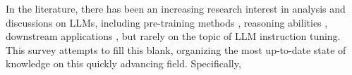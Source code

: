 \documentclass[11pt]{article}
\begin{document}
In the literature, there has been an increasing research interest in analysis and discussions on LLMs, including pre-training methods \cite{zhao2023survey}, 
reasoning abilities \cite{huang2022towards},
downstream applications \cite{yang2023harnessing,sun2023pushing}, but rarely on the topic of LLM instruction tuning.
This survey attempts to 
fill this blank, 
organizing  the most up-to-date state of knowledge on this quickly advancing field.
Specifically, 
\end{document}
